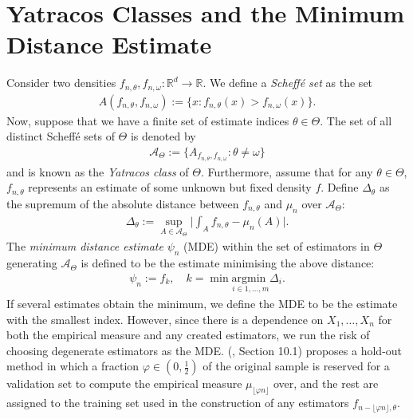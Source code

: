 \documentclass{report}
\begin{document}
\section{Yatracos Classes and the Minimum Distance Estimate}
Consider two densities $f_{n,\theta}, f_{n,\omega} : \mathbb{R}^d \rightarrow \mathbb{R}$. We define a \textit{Scheffé set} as the set
\begin{align*}
	A(f_{n,\theta},f_{n,\omega}) := \{x : f_{n,\theta}(x) > f_{n,\omega}(x)\}.
\end{align*}
Now, suppose that we have a finite set of estimate indices $\theta \in \Theta$. The set of all distinct Scheffé sets of $\Theta$ is denoted by
\begin{align*}
	\mathcal{A}_\Theta := \{A_{f_{n,\theta}, f_{n,\omega}} :  \theta \neq \omega\}
\end{align*}
and is known as the \textit{Yatracos class} of $\Theta$. Furthermore, assume that for any $\theta \in \Theta$, $f_{n,\theta}$ represents an estimate of some unknown but fixed density $f$.
Define $\Delta_\theta$ as the supremum of the absolute distance between $f_{n,\theta}$ and $\mu_n$ over $\mathcal{A}_\Theta$:
\begin{align*}
	\Delta_\theta := \sup_{A \in \mathcal{A}_\Theta} \bigg| \int_A f_{n,\theta} - \mu_n(A) \bigg|.
\end{align*}
The \textit{minimum distance estimate} $\psi_n$ (MDE) within the set of estimators in $\Theta$ generating $\mathcal{A}_\Theta$ is defined to be the estimate minimising 
the above distance:
\begin{align*}
	\psi_n := f_k,\quad k = \min \underset{i \in {1,\dots,m}}{\text{argmin }} \Delta_i.
\end{align*}
If several estimates obtain the minimum, we define the MDE to be the estimate with the smallest index. However, since there is a dependence on $X_1,\dots,X_n$ for both
the empirical measure and any created estimators, we run the risk of choosing degenerate estimators as the MDE.  (\cite{CMDE}, Section 10.1) proposes a hold-out method in 
which a fraction $\varphi \in (0,\frac{1}{2})$ of the original sample is reserved for a validation set to compute the empirical measure $\mu_{\lfloor\varphi n\rfloor}$ over, 
and the rest are assigned to the training set used in the construction of any estimators $f_{n-\lfloor\varphi n\rfloor, \theta}$.
\end{document}
